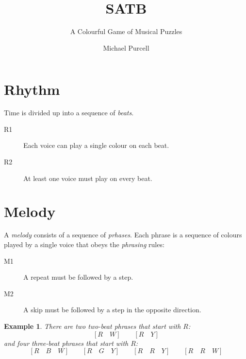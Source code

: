 \documentclass{scrartcl}
\title{SATB}
\subtitle{A Colourful Game of Musical Puzzles}
\author{Michael Purcell}
\date{}
\newtheorem{example}{Example}
\begin{document}
\maketitle
\section{Rhythm}
Time is divided up into a sequence of \emph{beats}.
\begin{description}
	\item[R1] Each voice can play a single colour on each beat.
	\item[R2] At least one voice must play on every beat.
\end{description}

\section{Melody}
A \emph{melody} consists of a sequence of \emph{prhases}. Each phrase is a sequence of colours played by a single voice that obeys the \emph{phrasing} rules:
\begin{description}
	\item[M1] A repeat must be followed by a step.
	\item[M2] A skip must be followed by a step in the opposite direction.
\end{description}

\begin{example}
There are two two-beat phrases that start with $R$:
\begin{equation}\nonumber
	[R \quad W] \qquad [R \quad Y]
\end{equation}
and four three-beat phrases that start with $R$:
\begin{equation}\nonumber
	[R \quad B \quad W] \qquad [R \quad G \quad Y] \qquad [R \quad R \quad Y] \qquad [R \quad R \quad W]
\end{equation}
\end{example}
\end{document}
